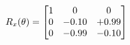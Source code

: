 \documentclass[preview]{standalone}
\begin{document}
\begin{align*}
\special{dvisvgm:raw <g id='unique000'>}R_{x}(\theta) = \begin{bmatrix}1 & 0 & 0 \\0 & -0.10 & +0.99 \\0 & -0.99 & -0.10\end{bmatrix}\special{dvisvgm:raw </g>}
\end{align*}
\end{document}
